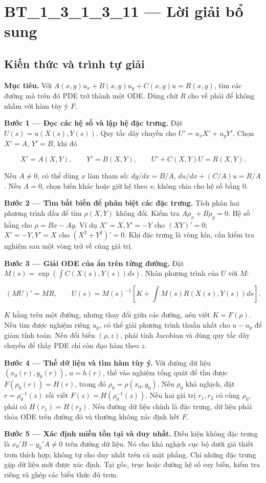 \documentclass[10pt,a4paper]{article}
\begin{document}
\section*{BT\_1\_3\_1\_3\_11 — Lời giải bổ sung}
\subsection*{Kiến thức và trình tự giải}
\textbf{Mục tiêu.} Với $A(x,y)u_x+B(x,y)u_y+C(x,y)u=R(x,y)$, tìm các đường mà trên đó PDE trở thành một ODE. Dùng chữ $R$ cho vế phải để không nhầm với hàm tùy ý $F$.

\textbf{Bước 1 — Đọc các hệ số và lập hệ đặc trưng.} Đặt $U(s)=u(X(s),Y(s))$. Quy tắc dây chuyền cho $U'=u_xX'+u_yY'$. Chọn $X'=A$, $Y'=B$, khi đó

\[
X'=A(X,Y),\qquad Y'=B(X,Y),\qquad U'+C(X,Y)U=R(X,Y).
\]

Nếu $A\ne0$, có thể dùng $x$ làm tham số: $dy/dx=B/A$, $du/dx+(C/A)u=R/A$. Nếu $A=0$, chọn biến khác hoặc giữ hệ theo $s$; không chia cho hệ số bằng 0.

\textbf{Bước 2 — Tìm bất biến để phân biệt các đặc trưng.} Tích phân hai phương trình đầu để tìm $\rho(X,Y)$ không đổi. Kiểm tra $A\rho_x+B\rho_y=0$. Hệ số hằng cho $\rho=Bx-Ay$. Ví dụ $X'=X,Y'=-Y$ cho $(XY)'=0$; $X'=-Y,Y'=X$ cho $(X^2+Y^2)'=0$. Khi đặc trưng là vòng kín, cần kiểm tra nghiệm sau một vòng trở về cùng giá trị.

\textbf{Bước 3 — Giải ODE của ẩn trên từng đường.} Đặt $M(s)=\exp(\int C(X(s),Y(s))ds)$. Nhân phương trình của $U$ với $M$:

\[
(MU)'=MR,\qquad
U(s)=M(s)^{-1}\left[K+\int M(s)R(X(s),Y(s))ds\right].
\]

$K$ hằng trên một đường, nhưng thay đổi giữa các đường, nên viết $K=F(\rho)$. Nếu tìm được nghiệm riêng $u_p$, có thể giải phương trình thuần nhất cho $u-u_p$ để giảm tính toán. Nếu đổi biến $(\rho,z)$, phải tính Jacobian và dùng quy tắc dây chuyền để thấy PDE chỉ còn đạo hàm theo $z$.

\textbf{Bước 4 — Thế dữ liệu và tìm hàm tùy ý.} Với đường dữ liệu $(x_0(r),y_0(r))$, $u=h(r)$, thế vào nghiệm tổng quát để thu được $F(\rho_0(r))=H(r)$, trong đó $\rho_0=\rho(x_0,y_0)$. Nếu $\rho_0$ khả nghịch, đặt $r=\rho_0^{-1}(z)$ rồi viết $F(z)=H(\rho_0^{-1}(z))$. Nếu hai giá trị $r_1,r_2$ có cùng $\rho_0$, phải có $H(r_1)=H(r_2)$. Nếu đường dữ liệu chính là đặc trưng, dữ liệu phải thỏa ODE trên đường đó và thường không xác định hết $F$.

\textbf{Bước 5 — Xác định miền tồn tại và duy nhất.} Điều kiện không đặc trưng là $x_0'B-y_0'A\ne0$ trên đường dữ liệu. Nó cho khả nghịch cục bộ dưới giả thiết trơn thích hợp; không tự cho duy nhất trên cả mặt phẳng. Chỉ những đặc trưng gặp dữ liệu mới được xác định. Tại gốc, trục hoặc đường hệ số suy biến, kiểm tra riêng và ghép các biểu thức đủ trơn.
\end{document}
